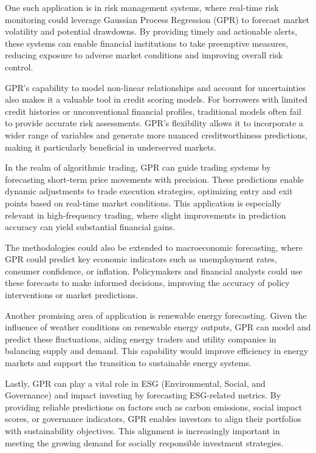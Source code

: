 One such application is in risk management systems, where real-time risk monitoring could leverage Gaussian Process Regression (GPR) to forecast market volatility and potential drawdowns. By providing timely and actionable alerts, these systems can enable financial institutions to take preemptive measures, reducing exposure to adverse market conditions and improving overall risk control.

GPR's capability to model non-linear relationships and account for uncertainties also makes it a valuable tool in credit scoring models. For borrowers with limited credit histories or unconventional financial profiles, traditional models often fail to provide accurate risk assessments. \ac{GPR}'s flexibility allows it to incorporate a wider range of variables and generate more nuanced creditworthiness predictions, making it particularly beneficial in underserved markets.

In the realm of algorithmic trading, GPR can guide trading systems by forecasting short-term price movements with precision. These predictions enable dynamic adjustments to trade execution strategies, optimizing entry and exit points based on real-time market conditions. This application is especially relevant in high-frequency trading, where slight improvements in prediction accuracy can yield substantial financial gains.

The methodologies could also be extended to macroeconomic forecasting, where GPR could predict key economic indicators such as unemployment rates, consumer confidence, or inflation. Policymakers and financial analysts could use these forecasts to make informed decisions, improving the accuracy of policy interventions or market predictions.

Another promising area of application is renewable energy forecasting. Given the influence of weather conditions on renewable energy outputs, GPR can model and predict these fluctuations, aiding energy traders and utility companies in balancing supply and demand. This capability would improve efficiency in energy markets and support the transition to sustainable energy systems.

Lastly, GPR can play a vital role in ESG (Environmental, Social, and Governance) and impact investing by forecasting ESG-related metrics. By providing reliable predictions on factors such as carbon emissions, social impact scores, or governance indicators, GPR enables investors to align their portfolios with sustainability objectives. This alignment is increasingly important in meeting the growing demand for socially responsible investment strategies.

